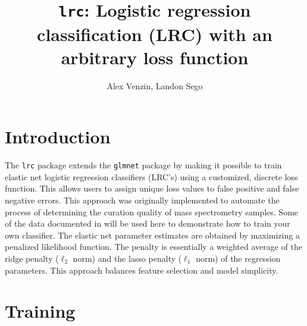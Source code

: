 \documentclass{article}
\begin{document}
 


\title{{\tt lrc}: Logistic regression classification (LRC) with an arbitrary loss function\\}
\author{Alex Venzin, Landon Sego}
\maketitle

\section{Introduction}

The {\tt lrc} package extends the {\tt glmnet} package by making it possible to train elastic net logistic 
regression classifiers (LRC's) using a customized, discrete loss function.  This allows users to assign unique loss values 
to false positive and false negative errors. This approach was originally implemented to automate the process 
of determining the curation quality of mass spectrometry samples. Some of the data documented in \cite{thepaper} 
will be used here to demonstrate how to train your own classifier. The elastic net parameter estimates are 
obtained by maximizing a penalized likelihood function. The penalty is essentially a weighted average of the 
ridge penalty ($\ell_2$ norm) and the lasso penalty ($\ell_1$ norm) of the regression parameters.  This approach 
balances feature selection and model simplicity. 

\section{Training}
\end{document}
